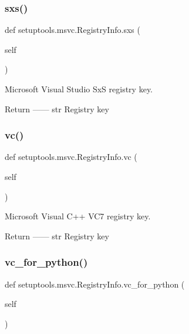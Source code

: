 \subsubsection{\texorpdfstring{sxs()}{sxs()}}
{\footnotesize\ttfamily def setuptools.\+msvc.\+Registry\+Info.\+sxs (\begin{DoxyParamCaption}\item[{}]{self }\end{DoxyParamCaption})}

\begin{DoxyVerb}Microsoft Visual Studio SxS registry key.

Return
------
str
    Registry key
\end{DoxyVerb}
 \mbox{\label{classsetuptools_1_1msvc_1_1RegistryInfo_a15b2a92fa7a73cdab831a78bddeaa9ce}} 
\subsubsection{\texorpdfstring{vc()}{vc()}}
{\footnotesize\ttfamily def setuptools.\+msvc.\+Registry\+Info.\+vc (\begin{DoxyParamCaption}\item[{}]{self }\end{DoxyParamCaption})}

\begin{DoxyVerb}Microsoft Visual C++ VC7 registry key.

Return
------
str
    Registry key
\end{DoxyVerb}
 \mbox{\label{classsetuptools_1_1msvc_1_1RegistryInfo_a0b3312fb81aa1413b38c3b334330e008}} 
\subsubsection{\texorpdfstring{vc\+\_\+for\+\_\+python()}{vc\_for\_python()}}
{\footnotesize\ttfamily def setuptools.\+msvc.\+Registry\+Info.\+vc\+\_\+for\+\_\+python (\begin{DoxyParamCaption}\item[{}]{self }\end{DoxyParamCaption})}

